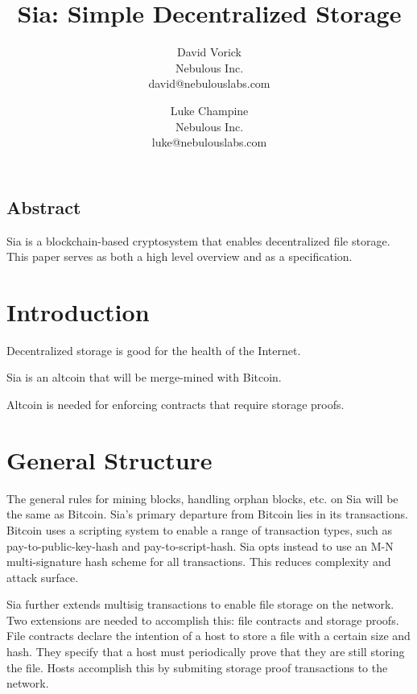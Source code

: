 \documentclass[twocolumn]{article}
\begin{document}
\frenchspacing

\title{Sia: Simple Decentralized Storage}

\author{
{\rm David Vorick}\\
Nebulous Inc.\\
david@nebulouslabs.com
\and
{\rm Luke Champine}\\
Nebulous Inc.\\
luke@nebulouslabs.com
}

\maketitle

\subsection*{Abstract}
Sia is a blockchain-based cryptosystem that enables decentralized file storage.
This paper serves as both a high level overview and as a specification.

\section{Introduction}
Decentralized storage is good for the health of the Internet.

Sia is an altcoin that will be merge-mined with Bitcoin.

Altcoin is needed for enforcing contracts that require storage proofs.

\section{General Structure}

The general rules for mining blocks, handling orphan blocks, etc. on Sia will be the same as Bitcoin.
Sia's primary departure from Bitcoin lies in its transactions.
Bitcoin uses a scripting system to enable a range of transaction types, such as pay-to-public-key-hash and pay-to-script-hash.
Sia opts instead to use an M-N multi-signature hash scheme for all transactions.
This reduces complexity and attack surface.

Sia further extends multisig transactions to enable file storage on the network.
Two extensions are needed to accomplish this: file contracts and storage proofs.
File contracts declare the intention of a host to store a file with a certain size and hash.
They specify that a host must periodically prove that they are still storing the file.
Hosts accomplish this by submiting storage proof transactions to the network.
\end{document}
